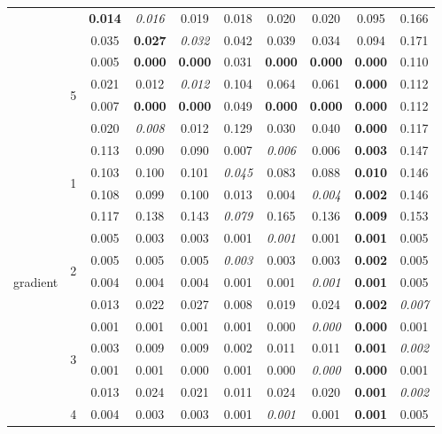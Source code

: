 \documentclass[authoryear, review, 11pt]{elsarticle}
\begin{document}
\begin{table}
\begin{center}
{\begin{tabular}{cccccccccc}
   &  & \textbf{0.014} & \emph{0.016} & 0.019 & 0.018 & 0.020 & 0.020 & 0.095 & 0.166 \\ 
   &  & 0.035 & \textbf{0.027} & \emph{0.032} & 0.042 & 0.039 & 0.034 & 0.094 & 0.171 \\ 
  \cline{3-10}
   & \multirow{4}{*}{5} & 0.005 & \textbf{0.000} & \textbf{0.000} & 0.031 & \textbf{0.000} & \textbf{0.000} & \textbf{0.000} & 0.110 \\ 
   &  & 0.021 & 0.012 & \emph{0.012} & 0.104 & 0.064 & 0.061 & \textbf{0.000} & 0.112 \\ 
   &  & 0.007 & \textbf{0.000} & \textbf{0.000} & 0.049 & \textbf{0.000} & \textbf{0.000} & \textbf{0.000} & 0.112 \\ 
   &  & 0.020 & \emph{0.008} & 0.012 & 0.129 & 0.030 & 0.040 & \textbf{0.000} & 0.117 \\ 
  \hline
  \multirow{20}{*}{gradient} & \multirow{4}{*}{1} & 0.113 & 0.090 & 0.090 & 0.007 & \emph{0.006} & 0.006 & \textbf{0.003} & 0.147 \\ 
   &  & 0.103 & 0.100 & 0.101 & \emph{0.045} & 0.083 & 0.088 & \textbf{0.010} & 0.146 \\ 
   &  & 0.108 & 0.099 & 0.100 & 0.013 & 0.004 & \emph{0.004} & \textbf{0.002} & 0.146 \\ 
   &  & 0.117 & 0.138 & 0.143 & \emph{0.079} & 0.165 & 0.136 & \textbf{0.009} & 0.153 \\ 
  \cline{3-10}
   & \multirow{4}{*}{2} & 0.005 & 0.003 & 0.003 & 0.001 & \emph{0.001} & 0.001 & \textbf{0.001} & 0.005 \\ 
   &  & 0.005 & 0.005 & 0.005 & \emph{0.003} & 0.003 & 0.003 & \textbf{0.002} & 0.005 \\ 
   &  & 0.004 & 0.004 & 0.004 & 0.001 & 0.001 & \emph{0.001} & \textbf{0.001} & 0.005 \\ 
   &  & 0.013 & 0.022 & 0.027 & 0.008 & 0.019 & 0.024 & \textbf{0.002} & \emph{0.007} \\ 
  \cline{3-10}
   & \multirow{4}{*}{3} & 0.001 & 0.001 & 0.001 & 0.001 & 0.000 & \emph{0.000} & \textbf{0.000} & 0.001 \\ 
   &  & 0.003 & 0.009 & 0.009 & 0.002 & 0.011 & 0.011 & \textbf{0.001} & \emph{0.002} \\ 
   &  & 0.001 & 0.001 & 0.000 & 0.001 & 0.000 & \emph{0.000} & \textbf{0.000} & 0.001 \\ 
   &  & 0.013 & 0.024 & 0.021 & 0.011 & 0.024 & 0.020 & \textbf{0.001} & \emph{0.002} \\ 
  \cline{3-10}
   & \multirow{4}{*}{4} & 0.004 & 0.003 & 0.003 & 0.001 & \emph{0.001} & 0.001 & \textbf{0.001} & 0.005 \\ 

\end{tabular}}
\end{center}
\end{table}
\end{document}
